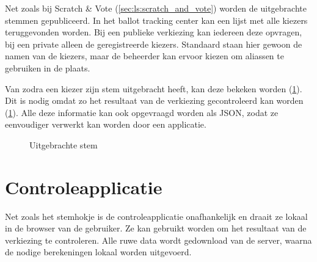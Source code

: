 Net zoals bij Scratch \& Vote (\ref{sec:ls:scratch_and_vote}) worden de uitgebrachte stemmen gepubliceerd. In het ballot tracking center kan een lijst met alle kiezers teruggevonden worden. Bij een publieke verkiezing kan iedereen deze opvragen, bij een private alleen de geregistreerde kiezers. Standaard staan hier gewoon de namen van de kiezers, maar de beheerder kan ervoor kiezen om aliassen te gebruiken in de plaats.

\npar Van zodra een kiezer zijn stem uitgebracht heeft, kan deze bekeken worden (\ref{fig:helios:cast_vote}). Dit is nodig omdat zo het resultaat van de verkiezing gecontroleerd kan worden (\ref{sec:helios:controleapplicatie}). Alle deze informatie kan ook opgevraagd worden als JSON, zodat ze eenvoudiger verwerkt kan worden door een applicatie.

\begin{figure}
  \caption{Uitgebrachte stem}
  \label{fig:helios:cast_vote}
\end{figure}

\section{Controleapplicatie}
\label{sec:helios:controleapplicatie}

Net zoals het stemhokje is de controleapplicatie onafhankelijk en draait ze lokaal in de browser van de gebruiker. Ze kan gebruikt worden om het resultaat van de verkiezing te controleren. Alle ruwe data wordt gedownload van de server, waarna de nodige berekeningen lokaal worden uitgevoerd.
